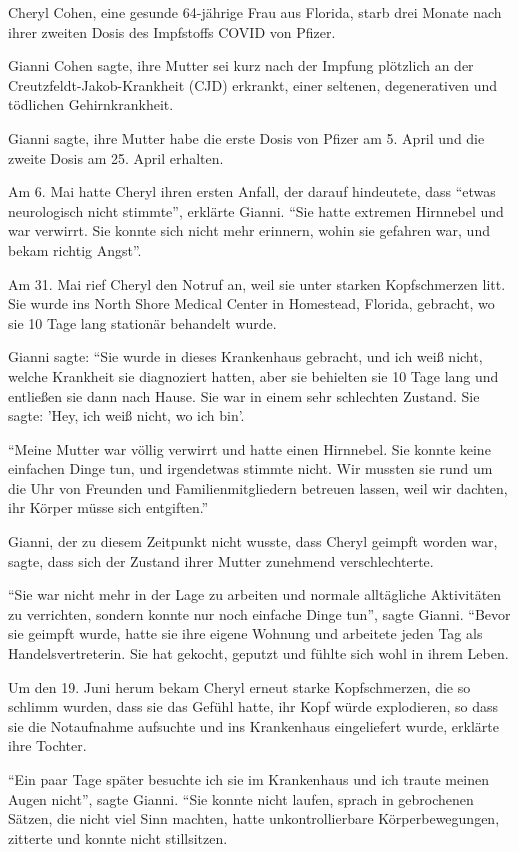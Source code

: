Cheryl Cohen, eine gesunde 64-jährige Frau aus Florida, starb drei Monate nach
ihrer zweiten Dosis des Impfstoffs COVID von Pfizer.

Gianni Cohen sagte, ihre Mutter sei kurz nach der Impfung plötzlich an der
Creutzfeldt-Jakob-Krankheit (CJD) erkrankt, einer seltenen, degenerativen und
tödlichen Gehirnkrankheit.

Gianni sagte, ihre Mutter habe die erste Dosis von Pfizer am 5. April und die
zweite Dosis am 25. April erhalten.

Am 6. Mai hatte Cheryl ihren ersten Anfall, der darauf hindeutete, dass ``etwas
neurologisch nicht stimmte'', erklärte Gianni. ``Sie hatte extremen Hirnnebel
und war verwirrt. Sie konnte sich nicht mehr erinnern, wohin sie gefahren war,
und bekam richtig Angst''.

Am 31. Mai rief Cheryl den Notruf an, weil sie unter starken Kopfschmerzen
litt. Sie wurde ins North Shore Medical Center in Homestead, Florida, gebracht,
wo sie 10 Tage lang stationär behandelt wurde.

Gianni sagte: ``Sie wurde in dieses Krankenhaus gebracht, und ich weiß nicht,
welche Krankheit sie diagnoziert hatten, aber sie behielten sie 10 Tage lang und
entließen sie dann nach Hause. Sie war in einem sehr schlechten Zustand. Sie
sagte: 'Hey, ich weiß nicht, wo ich bin'.

``Meine Mutter war völlig verwirrt und hatte einen Hirnnebel. Sie konnte keine
einfachen Dinge tun, und irgendetwas stimmte nicht. Wir mussten sie rund um die
Uhr von Freunden und Familienmitgliedern betreuen lassen, weil wir dachten, ihr
Körper müsse sich entgiften.''

Gianni, der zu diesem Zeitpunkt nicht wusste, dass Cheryl geimpft worden war,
sagte, dass sich der Zustand ihrer Mutter zunehmend verschlechterte.

``Sie war nicht mehr in der Lage zu arbeiten und normale alltägliche Aktivitäten
zu verrichten, sondern konnte nur noch einfache Dinge tun'', sagte
Gianni. ``Bevor sie geimpft wurde, hatte sie ihre eigene Wohnung und arbeitete
jeden Tag als Handelsvertreterin. Sie hat gekocht, geputzt und fühlte sich wohl
in ihrem Leben.

Um den 19. Juni herum bekam Cheryl erneut starke Kopfschmerzen, die so schlimm
wurden, dass sie das Gefühl hatte, ihr Kopf würde explodieren, so dass sie die
Notaufnahme aufsuchte und ins Krankenhaus eingeliefert wurde, erklärte ihre
Tochter.

``Ein paar Tage später besuchte ich sie im Krankenhaus und ich traute meinen
Augen nicht'', sagte Gianni. ``Sie konnte nicht laufen, sprach in gebrochenen
Sätzen, die nicht viel Sinn machten, hatte unkontrollierbare Körperbewegungen,
zitterte und konnte nicht stillsitzen.

